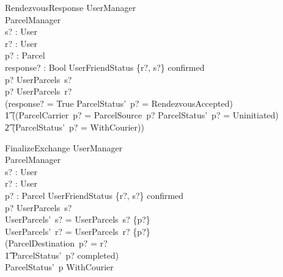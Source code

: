 \documentclass{article}
\begin{document}
\begin{schema}{RendezvousResponse}
	\Delta UserManager\\
	\Delta ParcelManager\\
	s? : User\\
	r? : User\\
	p? : Parcel\\
	response? : Bool
	\where
	UserFriendStatus \{r?, s?\} \mapsto confirmed\\
	p? \in UserParcels~s?\\
	p? \in UserParcels~r?\\
	(response? = True \land ParcelStatus'~p? = RendezvousAccepted) \lor\\
	\t1 ((ParcelCarrier~p? = ParcelSource~p? \land ParcelStatus'~p? = Uninitiated) \lor\\
	\t2 (ParcelStatus'~p? = WithCourier))\\
\end{schema}

\begin{schema}{FinalizeExchange}
	\Delta UserManager\\
	\Delta ParcelManager\\
	s? : User\\
	r? : User\\
	p? : Parcel
	\where
	UserFriendStatus \{r?, s?\} \mapsto confirmed\\
	p? \in UserParcels~s?\\
	UserParcels'~s? = UserParcels~s? \setminus \{p?\}\\
	UserParcels'~r? = UserParcels~r? \cup \{p?\}\\
	(ParcelDestination~p? = r? \\
	\t1 \land ParcelStatus'~p? \mapsto completed)\\
	\lor ParcelStatus'~p \mapsto WithCourier\\
\end{schema}
\end{document}
